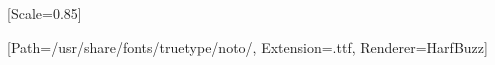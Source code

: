 \usepackage{fontspec}
\setmainfont{Noto Serif}
\setmonofont{Noto Sans Mono}[Scale=0.85]
\usepackage{luatexja-fontspec}

\usepackage{newunicodechar}
\newfontfamily{}[Path=/usr/share/fonts/truetype/noto/, Extension=.ttf, Renderer=HarfBuzz]

\usepackage{titling}
\pretitle{\begin{center}\LARGE\bfseries}
\posttitle{\par\end{center}}
\preauthor{\begin{center}\large}
\postauthor{\par\end{center}}
\predate{\begin{center}\large}
\postdate{\par\end{center}\vskip 2em}

\usepackage[table]{xcolor}
\usepackage{booktabs}
\usepackage{longtable}
\renewcommand{\arraystretch}{1.3}
